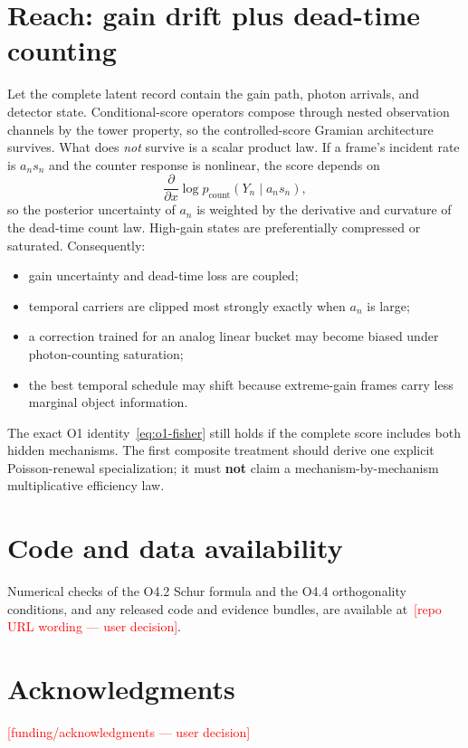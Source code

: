 \documentclass[11pt]{article}
\newcommand{\SPH}[1]{\textcolor{red}{[#1]}}
\theoremstyle{remark}
\begin{document}
\section{Reach: gain drift plus dead-time counting}
\label{sec:o5}
Let the complete latent record contain the gain path, photon arrivals, and
detector state. Conditional-score operators compose through nested observation
channels by the tower property, so the controlled-score Gramian architecture
survives. What does \emph{not} survive is a scalar product law. If a frame's
incident rate is $a_n s_n$ and the counter response is nonlinear, the score
depends on
\begin{equation*}
\frac{\partial}{\partial x} \log p_{\mathrm{count}}(Y_n\mid a_n s_n),
\end{equation*}
so the posterior uncertainty of $a_n$ is weighted by the derivative and
curvature of the dead-time count law. High-gain states are preferentially
compressed or saturated. Consequently:
\begin{itemize}
\item gain uncertainty and dead-time loss are coupled;
\item temporal carriers are clipped most strongly exactly when $a_n$ is large;
\item a correction trained for an analog linear bucket may become biased under
photon-counting saturation;
\item the best temporal schedule may shift because extreme-gain frames carry
less marginal object information.
\end{itemize}
The exact O1 identity~\eqref{eq:o1-fisher} still holds if the complete score
includes both hidden mechanisms. The first composite treatment should derive one
explicit Poisson-renewal specialization; it must \textbf{not} claim a
mechanism-by-mechanism multiplicative efficiency law.

\section*{Code and data availability}
Numerical checks of the O4.2 Schur formula and the O4.4 orthogonality
conditions, and any released code and evidence bundles, are available
at~\SPH{repo URL wording --- user decision}.

\section*{Acknowledgments}
\SPH{funding/acknowledgments --- user decision}

\nocite{*}


\end{document}
